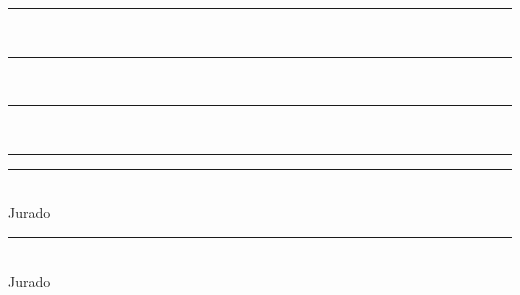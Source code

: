 
\begin{flushright}
	
	{\rule[1.6cm]{8cm}{0.6pt} \\
		\rule[1.6cm]{8cm}{0.6pt} \\
		\rule[1.6cm]{8cm}{0.6pt} \\
		\rule[1.6cm]{8cm}{0.6pt}
		\par}
		
	\vspace*{3cm}
	
	{\rule{8cm}{0.6pt} \\
		Jurado
		\par}
		
	\vspace*{3cm}
	
	{\rule{8cm}{0.6pt} \\
		Jurado
		\par}
	
\end{flushright}